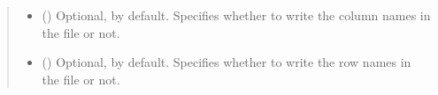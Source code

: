 \documentclass[letterpaper,10pt,english]{sphinxmanual}
\begin{document}
\begin{fulllineitems}
\begin{fulllineitems}
\begin{quote}
\begin{description}
\begin{itemize}
\item {} 
 () \textendash{} Optional,  by default. Specifies whether to write
the column names in the file or not.

\item {} 
 () \textendash{} Optional,  by default. Specifies whether to write
the row names in the file or not.

\end{itemize}

\end{description}\end{quote}

\end{fulllineitems}


\end{fulllineitems}

\end{document}
